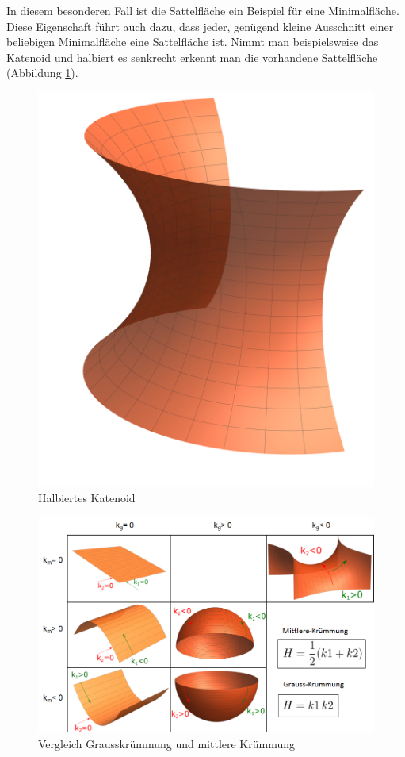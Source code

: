 \begin{refsection}
In diesem besonderen Fall ist die Sattelfläche ein Beispiel für eine Minimalfläche. Diese Eigenschaft führt auch dazu, dass jeder, genügend kleine Ausschnitt einer beliebigen Minimalfläche eine Sattelfläche ist. Nimmt man beispielsweise das Katenoid und halbiert es senkrecht erkennt man die vorhandene Sattelfläche (Abbildung \ref{fig:CatenoidHalf}). 

\begin{figure}
  \centering
  \includegraphics[angle=270,scale=0.1]{minimal/CatenoidHalf.pdf}
  \caption{Halbiertes Katenoid} 
  \label{fig:CatenoidHalf}
\end{figure}

\begin{figure} 
  \centering
  \includegraphics[scale=0.5]{minimal/Tabelle_Kruemmung.png}
  \caption{Vergleich Grausskrümmung und mittlere Krümmung} 
\end{figure}





\end{refsection}
